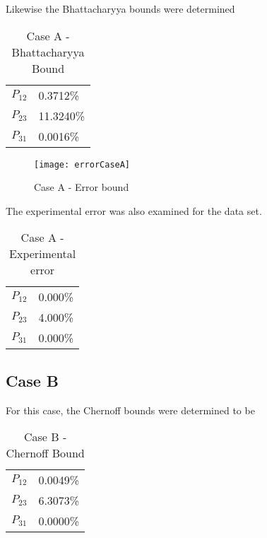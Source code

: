 Likewise the Bhattacharyya bounds were determined


\begin{table}[htb]
\begin{center}
\begin{tabular}{ll}
$P_{12}$ & 0.3712\%\\
$P_{23}$ & 11.3240\%\\
$P_{31}$ & 0.0016\%
\end{tabular}
\end{center}
\caption{Case A - Bhattacharyya Bound}
\label{tab: case a bhatt}
\end{table}

\begin{figure}
 \centering
 \texttt{[image: errorCaseA]}
 \caption{Case A - Error bound}
 \label{case a error}
\end{figure}

The experimental error was also examined for the data set.

\begin{table}[htb]
\begin{center}
\begin{tabular}{ll}
$P_{12}$ & 0.000\%\\
$P_{23}$ & 4.000\%\\
$P_{31}$ & 0.000\%
\end{tabular}
\end{center}
\caption{Case A - Experimental error}
\label{tab: case a experiment}
\end{table}


%

\newpage
\pagebreak

\subsection{Case B}

For this case, the Chernoff bounds were determined to be

\begin{table}[htb]
\begin{center}
\begin{tabular}{ll}
$P_{12}$ & 0.0049\%\\
$P_{23}$ & 6.3073\%\\
$P_{31}$ & 0.0000\%
\end{tabular}
\end{center}
\caption{Case B - Chernoff Bound}
\label{tab: case b chernoff}
\end{table}

